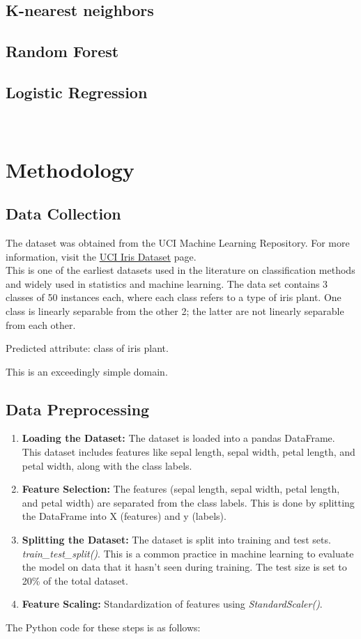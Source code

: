 \documentclass[a4paper]{article}
\begin{document}
\subsection{K-nearest neighbors}
\subsection{Random Forest}
\subsection{Logistic Regression}
\
\section{Methodology}
\subsection{Data Collection}
The dataset was obtained from the UCI Machine Learning Repository. For more information, visit the \href{https://archive.ics.uci.edu/ml/datasets/iris}{UCI Iris Dataset} page.\\
This is one of the earliest datasets used in the literature on classification methods and widely used in statistics and machine learning.  The data set contains 3 classes of 50 instances each, where each class refers to a type of iris plant.  One class is linearly separable from the other 2; the latter are not linearly separable from each other.

Predicted attribute: class of iris plant.

This is an exceedingly simple domain.

\subsection{Data Preprocessing}
\begin{enumerate}
	\item \textbf{Loading the Dataset:} The dataset is loaded into a pandas DataFrame. This dataset includes features like sepal length, sepal width, petal length, and petal width, along with the class labels.
	\item \textbf{Feature Selection:} The features (sepal length, sepal width, petal length, and petal width) are separated from the class labels. This is done by splitting the DataFrame into X (features) and y (labels).
	\item \textbf{Splitting the Dataset:} The dataset is split into training and test sets.
	\textit{train\_test\_split()}. This is a common practice in machine learning to evaluate the model on data that it hasn't seen during training. The test size is set to 20\% of the total dataset.
	
	\item \textbf{Feature Scaling:} Standardization of features using \textit{StandardScaler()}.
\end{enumerate}
The Python code for these steps is as follows:
\end{document}
